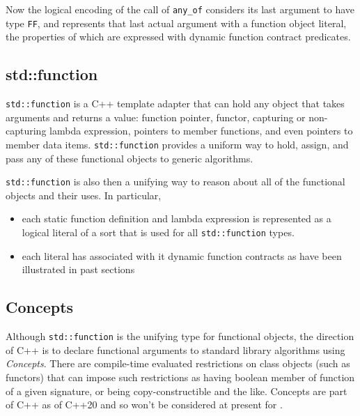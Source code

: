 

Now the logical encoding of the call of \lstinline|any_of| considers its last argument to have type \lstinline|FF|,
and represents that last actual argument with a function object literal, the properties of which are expressed with
dynamic function contract predicates.

\subsection{std::function}
\label{sec:stdfunction}

\lstinline|std::function| is a C++ template adapter that can hold any object that takes arguments and returns a value: function pointer,
functor,
capturing or non-capturing lambda expression,
pointers to member functions,
and even pointers to member data items.
 \lstinline|std::function|  provides a uniform way to hold, assign, and pass any of these functional objects to generic algorithms.

 \lstinline|std::function| is also then a unifying way to reason about all of the functional objects and their uses. In particular,
 \begin{itemize}[noitemsep,nolistsep]
 	\item each static function definition and lambda expression is
 	represented as a logical literal of a sort that is used for all
 	\lstinline|std::function| types.
 	\item each literal has associated with it dynamic function contracts as have been illustrated in past sections
 \end{itemize}

\subsection{Concepts}
\label{sec:concepts}
Although \lstinline|std::function| is the unifying type for functional objects, the direction of C++ is to declare functional
arguments to standard library algorithms using \emph{Concepts}.
There are compile-time evaluated restrictions on class objects (such as
functors) that can impose such restrictions as having boolean member of function of a given signature, or being copy-constructible and the like.
Concepts are part of C++ as of C++20 and so won't be considered
at present
for \NAME.



